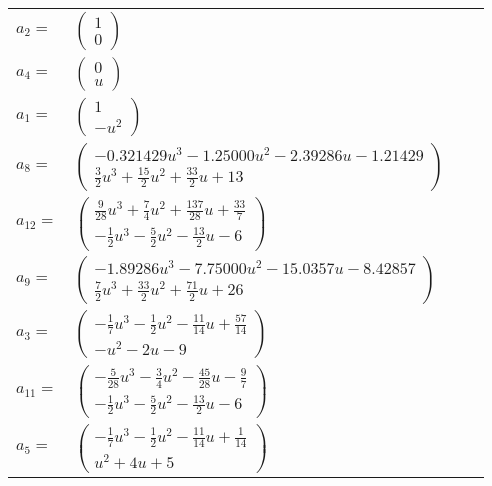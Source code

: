 \documentclass[1p]{elsarticle_modified}
\theoremstyle{definition}
\begin{document}
\begin{tabular}{m{7pt} m{180pt} m{7pt} m{180pt} }
\flushright $a_{2}=$&$\begin{pmatrix}1\\0\end{pmatrix}$ \\
\flushright $a_{4}=$&$\begin{pmatrix}0\\u\end{pmatrix}$ \\
\flushright $a_{1}=$&$\begin{pmatrix}1\\- u^2\end{pmatrix}$ \\
\flushright $a_{8}=$&$\begin{pmatrix}-0.321429 u^{3}-1.25000 u^{2}-2.39286 u-1.21429\\\frac{3}{2} u^3+\frac{15}{2} u^2+\frac{33}{2} u+13\end{pmatrix}$ \\
\flushright $a_{12}=$&$\begin{pmatrix}\frac{9}{28} u^3+\frac{7}{4} u^2+\frac{137}{28} u+\frac{33}{7}\\-\frac{1}{2} u^3-\frac{5}{2} u^2-\frac{13}{2} u-6\end{pmatrix}$ \\
\flushright $a_{9}=$&$\begin{pmatrix}-1.89286 u^{3}-7.75000 u^{2}-15.0357 u-8.42857\\\frac{7}{2} u^3+\frac{33}{2} u^2+\frac{71}{2} u+26\end{pmatrix}$ \\
\flushright $a_{3}=$&$\begin{pmatrix}-\frac{1}{7} u^3-\frac{1}{2} u^2-\frac{11}{14} u+\frac{57}{14}\\- u^2-2 u-9\end{pmatrix}$ \\
\flushright $a_{11}=$&$\begin{pmatrix}-\frac{5}{28} u^3-\frac{3}{4} u^2-\frac{45}{28} u-\frac{9}{7}\\-\frac{1}{2} u^3-\frac{5}{2} u^2-\frac{13}{2} u-6\end{pmatrix}$ \\
\flushright $a_{5}=$&$\begin{pmatrix}-\frac{1}{7} u^3-\frac{1}{2} u^2-\frac{11}{14} u+\frac{1}{14}\\u^2+4 u+5\end{pmatrix}$ \\

\end{tabular}
\end{document}
